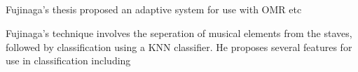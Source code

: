 \subsection{\cite{fujinaga1996adaptive}}

Fujinaga's thesis proposed an adaptive system for use with OMR etc

Fujinaga's technique involves the seperation of musical elements from the staves, followed by
classification using a \acrfull{KNN} classifier. He proposes several features for use in classification including 
